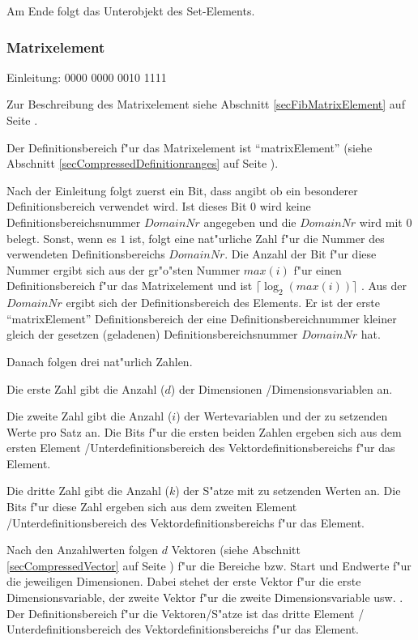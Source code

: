 Am Ende folgt das Unterobjekt des Set-Elements.



\subsubsection{Matrixelement}
\label{secCompressedFibMatrix}

Einleitung: 0000 0000 0010 1111

\bigskip\noindent
Zur Beschreibung des Matrixelement siehe Abschnitt \ref{secFibMatrixElement} auf Seite \pageref{secFibMatrixElement} .

Der Definitionsbereich f"ur das Matrixelement ist ``matrixElement'' (siehe Abschnitt \ref{secCompressedDefinitionranges} auf Seite \pageref{secCompressedDefinitionranges}).

Nach der Einleitung folgt zuerst ein Bit, dass angibt ob ein besonderer Definitionsbereich verwendet wird. Ist dieses Bit $0$ wird keine Definitionsbereichsnummer $DomainNr$ angegeben und die $DomainNr$ wird mit 0 belegt. Sonst, wenn es $1$ ist, folgt eine nat"urliche Zahl f"ur die Nummer des verwendeten Definitionsbereichs $DomainNr$. Die Anzahl der Bit f"ur diese Nummer ergibt sich aus der gr"o"sten Nummer $max(i)$ f"ur einen Definitionsbereich f"ur das Matrixelement und ist $\lceil \log_2( max(i) ) \rceil$ .
Aus der $DomainNr$ ergibt sich der Definitionsbereich des Elements. Er ist der erste ``matrixElement'' Definitionsbereich der eine Definitionsbereichnummer kleiner gleich der gesetzen (geladenen) Definitionsbereichsnummer $DomainNr$ hat.

Danach folgen drei nat"urlich Zahlen.

Die erste Zahl gibt die Anzahl ($d$) der Dimensionen /Dimensionsvariablen an.

Die zweite Zahl gibt die Anzahl ($i$) der Wertevariablen und der zu setzenden Werte pro Satz an.
Die Bits f"ur die ersten beiden Zahlen ergeben sich aus dem ersten Element /Unterdefinitionsbereich des Vektordefinitionsbereichs f"ur das Element.

Die dritte Zahl gibt die Anzahl ($k$) der S"atze mit zu setzenden Werten an. Die Bits f"ur diese Zahl ergeben sich aus dem zweiten Element /Unterdefinitionsbereich des Vektordefinitionsbereichs f"ur das Element.

Nach den Anzahlwerten folgen $d$ Vektoren (siehe Abschnitt \ref{secCompressedVector} auf Seite \pageref{secCompressedVector}) f"ur die Bereiche bzw. Start und Endwerte f"ur die jeweiligen Dimensionen. Dabei stehet der erste Vektor f"ur die erste Dimensionsvariable, der zweite Vektor f"ur die zweite Dimensionsvariable usw. . Der Definitionsbereich f"ur die Vektoren/S"atze ist das dritte Element / Unterdefinitionsbereich des Vektordefinitionsbereichs f"ur das  Element.

